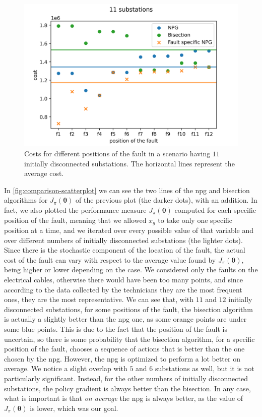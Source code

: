 \begin{figure}[htb]
    \centering
    \includegraphics[scale=0.9]{chapters/figures/scatterplot.png}
    \caption{Costs for different positions of the fault in a scenario having $11$ initially disconnected substations. The horizontal lines represent the average cost.}
    \label{fig:scatterplot}
\end{figure}

In \autoref{fig:comparison-scatterplot} we can see the two lines of the \acrshort{npg} and bisection algorithms for $J_\pi(\boldsymbol \theta)$ of the previous plot (the darker dots), with an addition. In fact, we also plotted the performance measure $J_\pi(\boldsymbol \theta)$ computed for each specific position of the fault, meaning that we allowed $x_g$ to take only one specific position at a time, and we iterated over every possible value of that variable and over different numbers of initially disconnected substations (the lighter dots). Since there is the stochastic component of the location of the fault, the actual cost of the fault can vary with respect to the average value found by $J_\pi(\boldsymbol \theta)$, being higher or lower depending on the case.
We considered only the faults on the electrical cables, otherwise there would have been too many points, and since according to the data collected by the technicians they are the most frequent ones, they are the most representative.
We can see that, with $11$ and $12$ initially disconnected substations, for some positions of the fault, the bisection algorithm is actually a slightly better than the \acrshort{npg} one, as some orange points are under some blue points. This is due to the fact that the position of the fault is uncertain, so there is some probability that the bisection algorithm, for a specific position of the fault, chooses a sequence of actions that is better than the one chosen by the \acrshort{npg}. However, the \acrshort{npg} is optimized to perform a lot better on average. We notice a slight overlap with $5$ and $6$ substations as well, but it is not particularly significant.
Instead, for the other numbers of initially disconnected substations, the policy gradient is always better than the bisection. In any case, what is important is that \emph{on average} the \acrshort{npg} is always better, as the value of $J_\pi(\boldsymbol \theta)$ is lower, which was our goal.


